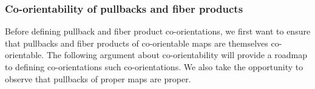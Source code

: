 \begin{comment}
BCOMMENT
 \red{Again, isn't the point that we don't know $\gamma$, so how can we fix the diagram to commute and then use that to determine $\gamma$? I think the idea is that we really need to say that the first diagram somehow determines this diagram via some conventions (what are those?). Then we know what the maps on the right are because that's just the tensor product of co-orientations of $V$ and $W$. On the left we know $i$ since that's canonical somehow (we still need to look up a good reference for that), and then all these other things determine a unique $\gamma$ so that the diagram commutes. This $\gamma$ is our co-orientation for $P$. So I think this all needs to be clarified.}
 Any such set of choices then yields 
 a definition of pullback co-orientation through a diagram chase.  In concrete terms, fix a local orientation $\beta_M$ of $M$, and then
 use the co-orientations of $f$ and $g$ to identify compatible local orientations $\beta_V$ of $V$ and $\beta_W$ of $W$.  A fixed identification
 of the normal bundle of $\Delta M$ with the tangent bundle of $M$ then gives a $\beta_{\nu P \subset V \times W}$ which corresponds to $\beta_M$.
 The pullback co-orientation of the map $P \to M$ can then be defined pair $\beta_M$ with  a  
 local orientation $\beta_P$ of $P$ so that $\beta_P \otimes \beta_{\nu P \subset V \times W}$ maps to $\beta_V \otimes \beta_W$ under 
 the top horizontal isomorphism of Equation~\ref{co-or stuff}.
 ECOMMENT

  In order to obtain these properties we will develop additional structure to control  the
 isomorphisms in Diagram~\eqref{co-or stuff}.  We do this first by working at the level of vector spaces and linear maps over a point before expanding to local definitions and then
  back to the global level.  
  

\end{comment}




\subsubsection{Co-orientability of pullbacks and fiber products}

Before defining pullback and fiber product co-orientations, we first want to ensure that pullbacks and fiber products of co-orientable maps are themselves co-orientable. The following argument about co-orientability will  provide a roadmap to defining co-orientations such co-orientations. We also take the opportunity to observe that pullbacks of proper maps are proper.

